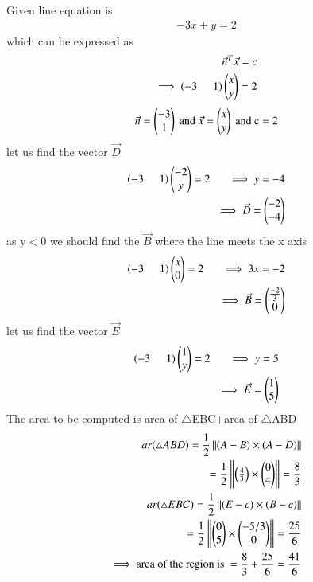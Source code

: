 \documentclass[journal]{IEEEtran}
\begin{document}
Given line equation is 
\begin{align}
    -3x+y=2
\end{align}
 which can be expressed as
 \begin{align}
     \Vec{n}^T\Vec{x}=c\\
     \implies \left(-3\hspace{0.5cm}1\right)\begin{pmatrix}x\\y\end{pmatrix}=2
    \end{align}
 \begin{align}
    \Vec{n}=\begin{pmatrix}-3\\1\end{pmatrix} \text{ and } \Vec{x}=\begin{pmatrix}x\\y\end{pmatrix} \text{ and c}=2
\end{align}
let us find the vector $\Vec{D}$
\begin{align}
    \left(-3\hspace{0.5cm}1\right)\begin{pmatrix}-2\\y\end{pmatrix}=2 \hspace{0.5cm} \implies y=-4\\
    \implies \Vec{D}= \begin{pmatrix}-2\\-4\end{pmatrix}
\end{align}
as y$<$0 we should find the $\Vec{B}$ where the line meets the x axis 
\begin{align}
    \left(-3\hspace{0.5cm}1\right)\begin{pmatrix}x\\0\end{pmatrix}=2 \hspace{0.5cm} \implies3x=-2\\
    \implies \Vec{B}= \begin{pmatrix}\frac{-2}{3}\\0\end{pmatrix}
    \end{align}
    let us find the vector $\Vec{E}$
    \begin{align}
    \left(-3\hspace{0.5cm}1\right)\begin{pmatrix}1\\y\end{pmatrix}=2 \hspace{0.5cm} \implies y=5\\
    \implies \Vec{E}= \begin{pmatrix}1\\5\end{pmatrix}
\end{align}
The area to be computed is area of $\triangle$EBC+area of $\triangle$ABD
\begin{align}
    ar(\triangle ABD)=\frac{1}{2}\left\lVert(A-B)\times(A-D)\right\rVert\\
    =\frac{1}{2}\left\lVert\begin{pmatrix}\frac{4}{3}\end{pmatrix}\times\begin{pmatrix}0\\4\end{pmatrix}\right\rVert=\frac{8}{3}\\
     ar(\triangle EBC)=\frac{1}{2}\left\lVert(E-c)\times(B-c)\right\rVert\\
    =\frac{1}{2}\left\lVert\begin{pmatrix}0\\5\end{pmatrix}\times\begin{pmatrix}-5/3\\0\end{pmatrix}\right\rVert=\frac{25}{6}\\
    \implies \text{area of the region is }=\frac{8}{3}+\frac{25}{6}=\frac{41}{6}
\end{align}
\end{document}
